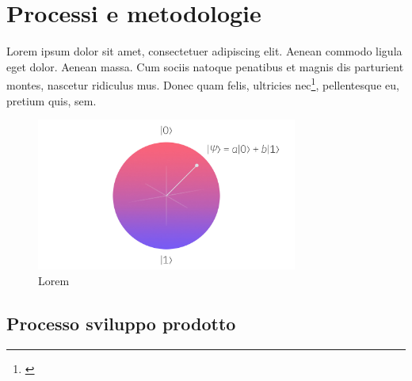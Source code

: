 \chapter{Processi e metodologie}
\label{chap:processi-metodologie}

Lorem ipsum dolor sit amet, consectetuer adipiscing elit. Aenean commodo ligula eget dolor. Aenean massa. Cum sociis natoque penatibus et magnis dis parturient montes, nascetur ridiculus mus. Donec quam felis, ultricies nec\footnote{\cite{article:spooky}}, pellentesque eu, pretium quis, sem.

\begin{figure}[h]
    \centering
    \includegraphics[height=5cm]{img/qubit.jpeg}
    \caption{Lorem}
    \label{fig:qubit}
\end{figure}

\lipsum[1]

\section{Processo sviluppo prodotto}
\lipsum[1,2]

\newpage